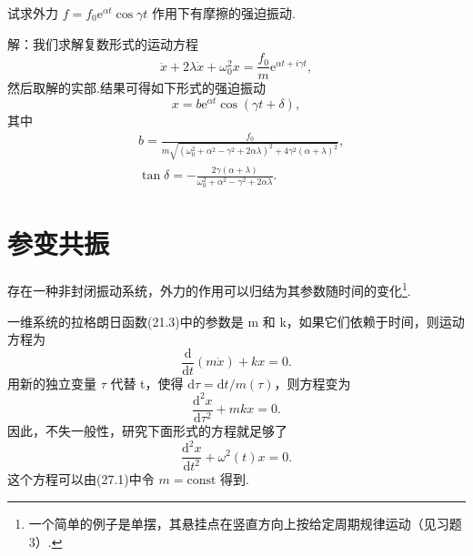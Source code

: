 \begin{xiti}

\quad 试求外力 $f=f_0\mathrm{e}^{\alpha t}\cos\gamma t$ 作用下有摩擦的强迫振动.

解：我们求解复数形式的运动方程
\begin{equation*}
  \ddot{x}+2\lambda\dot{x}+\omega_0^2x=\frac{f_0}{m}\mathrm{e}^{\alpha t+i\gamma t},
\end{equation*}
然后取解的实部.结果可得如下形式的强迫振动
\begin{equation*}
  x=b\mathrm{e}^{\alpha t}\cos(\gamma t+\delta),
\end{equation*}
其中
\begin{equation*}
\begin{aligned}
  &b=\frac{f_0}{m\sqrt{\left(\omega_0^2+\alpha^2-\gamma^2+2\alpha\lambda\right)^2
  +4\gamma^2\left(\alpha+\lambda\right)^2}},\\
  &\tan\delta=-\frac{2\gamma\left(\alpha+\lambda\right)}
  {\omega_0^2+\alpha^2-\gamma^2+2\alpha\lambda}.
\end{aligned}
\end{equation*}

\end{xiti}

\section{参变共振}

存在一种非封闭振动系统，外力的作用可以归结为其参数随时间的变化\footnote{一个简单的例子是单摆，其悬挂点在竖直方向上按给定周期规律运动（见习题3）.}.

一维系统的拉格朗日函数(21.3)中的参数是 m 和 k，如果它们依赖于时间，则运动方程为
\begin{equation}
  \frac{\mathrm{d}}{\mathrm{d}t}\left(m\dot{x}\right)+kx=0.
\end{equation}
用新的独立变量 $\tau$ 代替 t，使得 $\mathrm{d}\tau=\mathrm{d}t/m(\tau)$，则方程变为
\begin{equation*}
  \frac{\mathrm{d}^2x}{\mathrm{d}\tau^2}+mkx=0.
\end{equation*}
因此，不失一般性，研究下面形式的方程就足够了
\begin{equation}
  \frac{\mathrm{d}^2x}{\mathrm{d}t^2}+\omega^2(t)x=0.
\end{equation}
这个方程可以由(27.1)中令 $m=\mathrm{const}$ 得到.

